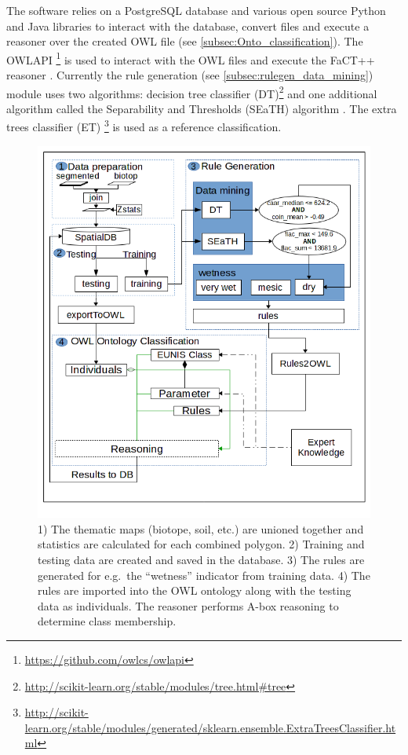 \documentclass[authoryear, review,12pt,number]{elsarticle}
\begin{document}
The software relies on a PostgreSQL database and various open source Python and
Java libraries to interact with the database, convert files and execute a
reasoner over the created OWL file (see \ref{subsec:Onto_classification}). The
OWLAPI \footnote{\url{https://github.com/owlcs/owlapi}} is used to interact with the
OWL files and execute the FaCT++ reasoner \citep{Tsarkov2006}. Currently the
rule generation (see \ref{subsec:rulegen_data_mining}) module uses two
algorithms:
decision tree classifier (DT)\footnote{\url{http://scikit-learn.org/stable/modules/tree.html#tree}} and
one additional algorithm called the Separability and Thresholds (SEaTH)
algorithm \citep{Nussbaum2006}. The extra trees classifier (ET)
\footnote{\url{http://scikit-learn.org/stable/modules/generated/sklearn.ensemble.ExtraTreesClassifier.html}}
is used as a reference classification.

\begin{figure}
\includegraphics[width=1\linewidth]{diagrams/final_workflow_diagram.png}
\caption
    {
        1) The thematic maps (biotope, soil, etc.) are unioned together and
        statistics are calculated for each combined polygon.
        2) Training and testing data are created and saved in the database.
        3) The rules are generated for e.g.\ the ``wetness'' indicator from
        training data.
        4) The rules are imported into the OWL ontology along with the testing
        data as individuals. The reasoner performs A-box reasoning to determine
        class membership.
    } 
\label{fig:full_workflow}
\end{figure}
\end{document}
